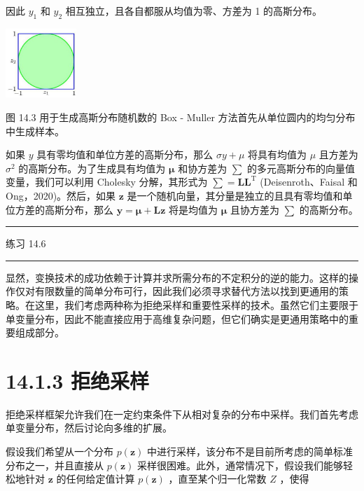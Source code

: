 \documentclass[10pt]{article}
\newcommand{\HRule}{\begin{center}\rule{0.9\linewidth}{0.2mm}\end{center}}
\begin{document}
因此 \({y}_{1}\) 和 \({y}_{2}\) 相互独立，且各自都服从均值为零、方差为 1 的高斯分布。

\begin{center}
\includegraphics[max width=0.2\textwidth]{images/0194e279-9b28-703a-88f4-c3ac21e2010d_452_1222_344_326_319_0.jpg}
\end{center}
\hspace*{3em} 

图 14.3 用于生成高斯分布随机数的 Box - Muller 方法首先从单位圆内的均匀分布中生成样本。

如果 \(y\) 具有零均值和单位方差的高斯分布，那么 \({\sigma y} + \mu\) 将具有均值为 \(\mu\) 且方差为 \({\sigma }^{2}\) 的高斯分布。为了生成具有均值为 \(\mathbf{\mu }\) 和协方差为 \(\mathbf{\sum }\) 的多元高斯分布的向量值变量，我们可以利用 Cholesky 分解，其形式为 \(\mathbf{\sum } = {\mathbf{{LL}}}^{\mathrm{T}}\) (Deisenroth、Faisal 和 Ong，2020)。然后，如果 \(\mathbf{z}\) 是一个随机向量，其分量是独立的且具有零均值和单位方差的高斯分布，那么 \(\mathbf{y} = \mathbf{\mu } + \mathbf{{Lz}}\) 将是均值为 \(\mathbf{\mu }\) 且协方差为 \(\mathbf{\sum }\) 的高斯分布。

\HRule

练习 14.6

\HRule

显然，变换技术的成功依赖于计算并求所需分布的不定积分的逆的能力。这样的操作仅对有限数量的简单分布可行，因此我们必须寻求替代方法以找到更通用的策略。在这里，我们考虑两种称为拒绝采样和重要性采样的技术。虽然它们主要限于单变量分布，因此不能直接应用于高维复杂问题，但它们确实是更通用策略中的重要组成部分。

\section*{14.1.3 拒绝采样}

拒绝采样框架允许我们在一定约束条件下从相对复杂的分布中采样。我们首先考虑单变量分布，然后讨论向多维的扩展。

假设我们希望从一个分布 \(p\left( \mathbf{z}\right)\) 中进行采样，该分布不是目前所考虑的简单标准分布之一，并且直接从 \(p\left( \mathbf{z}\right)\) 采样很困难。此外，通常情况下，假设我们能够轻松地针对 \(\mathbf{z}\) 的任何给定值计算 \(p\left( \mathbf{z}\right)\) ，直至某个归一化常数 \(Z\) ，使得
\end{document}
